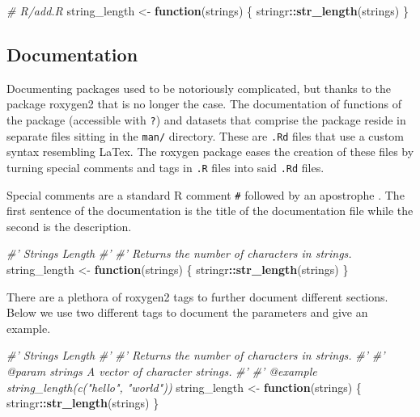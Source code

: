 \documentclass[10pt,]{krantz}
\makeatletter
\newenvironment{Shaded}{\begin{snugshade}}{\end{snugshade}}
\newcommand{\CommentTok}[1]{\textcolor[rgb]{0.37,0.37,0.37}{\textit{#1}}}
\newcommand{\ControlFlowTok}[1]{\textcolor[rgb]{0.27,0.27,0.27}{\textbf{#1}}}
\newcommand{\KeywordTok}[1]{\textcolor[rgb]{0.27,0.27,0.27}{\textbf{#1}}}
\newcommand{\NormalTok}[1]{#1}
\newcommand{\OperatorTok}[1]{\textcolor[rgb]{0.43,0.43,0.43}{\textbf{#1}}}
\newcommand{\StringTok}[1]{\textcolor[rgb]{0.5,0.5,0.5}{#1}}
\newenvironment{kframe}{%
\medskip{}
\setlength{\fboxsep}{.8em}
 \def\at@end@of@kframe{}%
 \ifinner\ifhmode%
  \def\at@end@of@kframe{\end{minipage}}%
  \begin{minipage}{\columnwidth}%
 \fi\fi%
 \def\FrameCommand##1{\hskip\@totalleftmargin \hskip-\fboxsep
 \colorbox{shadecolor}{##1}\hskip-\fboxsep
     \hskip-\linewidth \hskip-\@totalleftmargin \hskip\columnwidth}%
 \MakeFramed {\advance\hsize-\width
   \@totalleftmargin\z@ \linewidth\hsize
   \@setminipage}}%
 {\par\unskip\endMakeFramed%
 \at@end@of@kframe}
\renewenvironment{Shaded}{\begin{kframe}}{\end{kframe}}
\makeatother
\begin{document}
\begin{Shaded}
\begin{Highlighting}[]
\CommentTok{# R/add.R}
\NormalTok{string_length <-}\StringTok{ }\ControlFlowTok{function}\NormalTok{(strings) \{}
\NormalTok{  stringr}\OperatorTok{::}\KeywordTok{str_length}\NormalTok{(strings)}
\NormalTok{\}}
\end{Highlighting}
\end{Shaded}

\hypertarget{basics-documentation}{%
\subsection{Documentation}\label{basics-documentation}}

Documenting packages used to be notoriously complicated, but thanks to the package roxygen2 that is no longer the case. The documentation of functions of the package (accessible with \texttt{?}) and datasets that comprise the package reside in separate files sitting in the \texttt{man/} directory. These are \texttt{.Rd} files that use a custom syntax resembling LaTex. The roxygen package eases the creation of these files by turning special comments and tags in \texttt{.R} files into said \texttt{.Rd} files.

Special comments are a standard R comment \texttt{\#} followed by an apostrophe \texttt{\textquotesingle{}}. The first sentence of the documentation is the title of the documentation file while the second is the description.

\begin{Shaded}
\begin{Highlighting}[]
\CommentTok{#' Strings Length}
\CommentTok{#' }
\CommentTok{#' Returns the number of characters in strings. }
\NormalTok{string_length <-}\StringTok{ }\ControlFlowTok{function}\NormalTok{(strings) \{}
\NormalTok{  stringr}\OperatorTok{::}\KeywordTok{str_length}\NormalTok{(strings)}
\NormalTok{\}}
\end{Highlighting}
\end{Shaded}

There are a plethora of roxygen2 tags to further document different sections. Below we use two different tags to document the parameters and give an example.

\begin{Shaded}
\begin{Highlighting}[]
\CommentTok{#' Strings Length}
\CommentTok{#' }
\CommentTok{#' Returns the number of characters in strings. }
\CommentTok{#' }
\CommentTok{#' @param strings A vector of character strings.}
\CommentTok{#' }
\CommentTok{#' @example string_length(c("hello", "world"))}
\NormalTok{string_length <-}\StringTok{ }\ControlFlowTok{function}\NormalTok{(strings) \{}
\NormalTok{  stringr}\OperatorTok{::}\KeywordTok{str_length}\NormalTok{(strings)}
\NormalTok{\}}
\end{Highlighting}
\end{Shaded}
\end{document}
